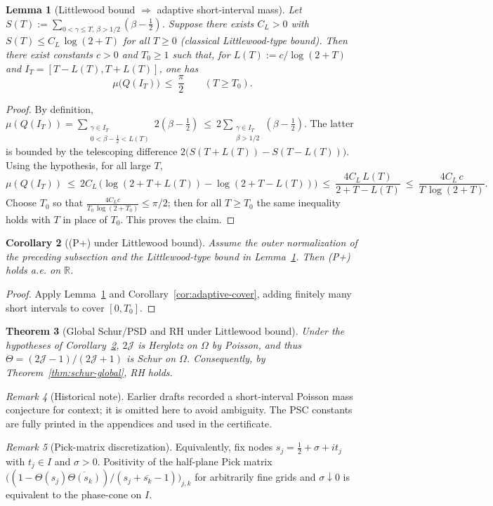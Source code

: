 \documentclass[11pt]{article}
\newtheorem{theorem}{Theorem}
\newtheorem{lemma}[theorem]{Lemma}
\newtheorem{corollary}[theorem]{Corollary}
\theoremstyle{definition}
\theoremstyle{remark}
\newtheorem{remark}[theorem]{Remark}
\newcommand{\R}{\mathbb{R}}
\begin{document}
\begin{lemma}[Littlewood bound \(\Rightarrow\) adaptive short-interval mass]\label{lem:littlewood-adaptive}
Let \(S(T):=\sum_{0<\gamma\le T,\ \beta>1/2}(\beta-\tfrac12)\). Suppose there exists \(C_L>0\) with \(S(T)\le C_L\,\log(2+T)\) for all \(T\ge 0\) (classical Littlewood-type bound). Then there exist constants \(c>0\) and \(T_0\ge 1\) such that, for \(L(T):=c/\log(2+T)\) and \(I_T=[T-L(T),T+L(T)]\), one has
\[
\mu\big(Q(I_T)\big)\ \le\ \frac{\pi}{2}\qquad (T\ge T_0).
\]
\end{lemma}
\begin{proof}
By definition, \(\mu(Q(I_T))=\sum_{\substack{\gamma\in I_T\\ 0<\beta-\tfrac12< L(T)}} 2(\beta-\tfrac12)\ \le\ 2\sum_{\substack{\gamma\in I_T\\ \beta>1/2}} (\beta-\tfrac12)\). The latter is bounded by the telescoping difference \(2\big(S(T+L(T)) - S(T-L(T))\big)\). Using the hypothesis, for all large \(T\),
\[
 \mu(Q(I_T))\ \le\ 2C_L\,\Big(\log(2+T+L(T)) - \log(2+T-L(T))\Big)
 \ \le\ \frac{4C_L\,L(T)}{2+T-L(T)}\ \le\ \frac{4C_L\,c}{T\,\log(2+T)}.
\]
Choose \(T_0\) so that \(\frac{4C_L c}{T_0\,\log(2+T_0)}\le \pi/2\); then for all \(T\ge T_0\) the same inequality holds with \(T\) in place of \(T_0\). This proves the claim.
\end{proof}
\begin{corollary}[(P+) under Littlewood bound]\label{cor:Pplus-Littlewood}
Assume the outer normalization of the preceding subsection and the Littlewood-type bound in Lemma~\ref{lem:littlewood-adaptive}. Then \emph{(P+)} holds a.e. on \(\R\).
\end{corollary}
\begin{proof}
Apply Lemma~\ref{lem:littlewood-adaptive} and Corollary~\ref{cor:adaptive-cover}, adding finitely many short intervals to cover \([0,T_0]\).
\end{proof}
\begin{theorem}[Global Schur/PSD and RH under Littlewood bound]\label{thm:global-RH-Littlewood}
Under the hypotheses of Corollary~\ref{cor:Pplus-Littlewood}, \(2\mathcal J\) is Herglotz on \(\Omega\) by Poisson, and thus \(\Theta=(2\mathcal J-1)/(2\mathcal J+1)\) is Schur on \(\Omega\). Consequently, by Theorem~\ref{thm:schur-global}, RH holds.
\end{theorem}
\begin{remark}[Historical note]
Earlier drafts recorded a short-interval Poisson mass conjecture for context; it is omitted here to avoid ambiguity. The PSC constants are fully printed in the appendices and used in the certificate.
\end{remark}
\begin{remark}[Pick-matrix discretization]\label{rem:pick-certificate}
Equivalently, fix nodes $s_j=\tfrac12+\sigma+i t_j$ with $t_j\in I$ and $\sigma>0$. Positivity of the half-plane Pick matrix \(\big((1-\Theta(s_j)\overline{\Theta(s_k)})/(s_j+\overline{s_k}-1)\big)_{j,k}\) for arbitrarily fine grids and $\sigma\downarrow 0$ is equivalent to the phase-cone on $I$. \end{remark}
\end{document}
